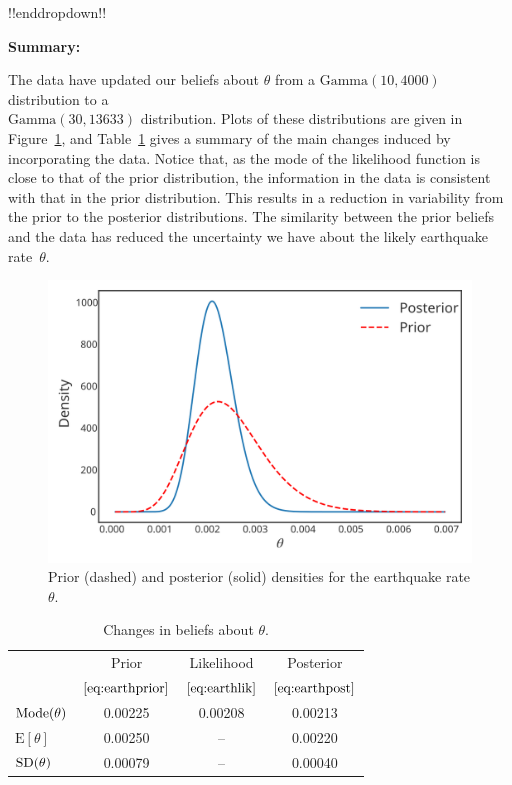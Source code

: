 {!!enddropdown!!


\textbf{Summary:}

The data have updated our beliefs about $\theta$ from a
$\mathrm{Gamma}(10,4000)$ distribution to a \\ $\mathrm{Gamma}(30,13633)$ distribution. Plots of
these distributions are given in Figure~\ref{fig:earthpost}, and Table~\ref{tab:earthsum} gives a summary of the main changes induced by incorporating the data. Notice that, as the mode of the likelihood function is close to that of the prior distribution, the information in the data is consistent with that in the prior distribution. This results in a reduction in variability from the prior to the posterior distributions. The similarity between the prior beliefs and the data has reduced the uncertainty we have about the likely earthquake rate~$\theta$.

\begin{figure}[ht]

\includegraphics{images/priorposterior3.svg}
\caption{Prior (dashed) and posterior (solid) densities for the earthquake rate $\theta$.} 
\label{fig:earthpost}

\end{figure}

\begin{table}[ht]

\begin{tabular}{|l|c|c|c|}
\cline{2-4}
\multicolumn{1}{c|}{~}& Prior & Likelihood & Posterior \\
\multicolumn{1}{c|}{~}& $\eqref{eq:earthprior}$ & $\eqref{eq:earthlik}$ 
& $\eqref{eq:earthpost}$ \\
\hline
$\textnormal{Mode}(\theta)$ & 0.00225 & 0.00208 & 0.00213 \\
$\text{E}[\theta]$ & 0.00250 & -- & 0.00220 \\
$\textnormal{SD}(\theta)$ & 0.00079 & -- & 0.00040 \\
\hline
\end{tabular}
\caption{Changes in beliefs about $\theta$.}
\label{tab:earthsum}

\end{table}}


